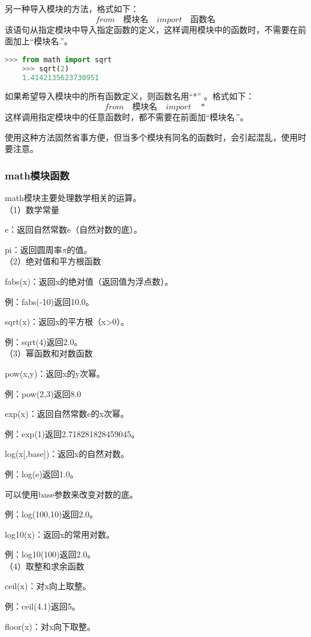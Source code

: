 \documentclass[11pt,a4paper]{article}
\begin{document}
另一种导入模块的方法，格式如下：
$$from \quad \mbox{模块名} \quad import \quad \mbox {函数名}$$
该语句从指定模块中导入指定函数的定义，这样调用模块中的函数时，不需要在前面加上“模块名.”。
\begin{lstlisting}[language={Python}]
    >>> from math import sqrt
    >>> sqrt(2)
    1.4142135623730951
\end{lstlisting}

如果希望导入模块中的所有函数定义，则函数名用“*” 。格式如下：
$$from \quad \mbox{模块名} \quad import \quad *$$
这样调用指定模块中的任意函数时，都不需要在前面加“模块名.”。

使用这种方法固然省事方便，但当多个模块有同名的函数时，会引起混乱，使用时要注意。

\subsubsection{math模块函数}

math模块主要处理数学相关的运算。\\
（1）数学常量

e：返回自然常数e（自然对数的底）。

pi：返回圆周率$\pi$的值。\\
（2）绝对值和平方根函数

fabs(x)：返回x的绝对值（返回值为浮点数）。

例：fabs(-10)返回10.0。

sqrt(x)：返回x的平方根（x>0）。

例：sqrt(4)返回2.0。\\
（3）幂函数和对数函数

pow(x,y)：返回x的y次幂。

例：pow(2,3)返回8.0

exp(x)：返回自然常数e的x次幂。

例：exp(1)返回2.718281828459045。

log(x[,base])：返回x的自然对数。

例：log(e)返回1.0。

可以使用base参数来改变对数的底。

例：log(100,10)返回2.0。

log10(x)：返回x的常用对数。

例：log10(100)返回2.0。\\
（4）取整和求余函数

ceil(x)：对x向上取整。

例：ceil(4.1)返回5。

floor(x)：对x向下取整。
\end{document}
